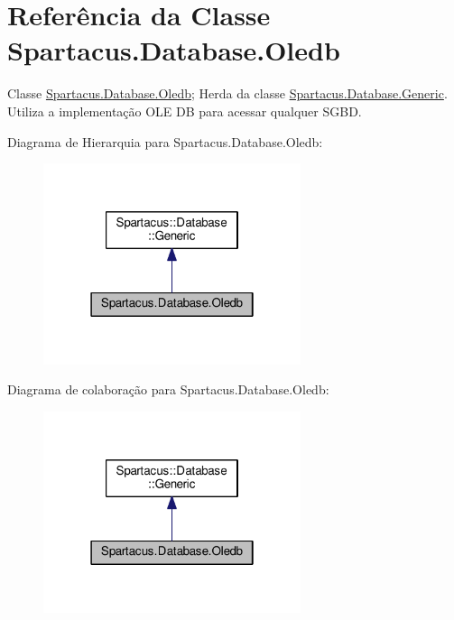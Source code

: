 \hypertarget{classSpartacus_1_1Database_1_1Oledb}{\section{Referência da Classe Spartacus.\+Database.\+Oledb}
\label{classSpartacus_1_1Database_1_1Oledb}
}


Classe \hyperlink{classSpartacus_1_1Database_1_1Oledb}{Spartacus.\+Database.\+Oledb}; Herda da classe \hyperlink{classSpartacus_1_1Database_1_1Generic}{Spartacus.\+Database.\+Generic}. Utiliza a implementação O\+L\+E D\+B para acessar qualquer S\+G\+B\+D.  




Diagrama de Hierarquia para Spartacus.\+Database.\+Oledb\+:
\nopagebreak
\begin{figure}[H]
\begin{center}
\leavevmode
\includegraphics[width=214pt]{classSpartacus_1_1Database_1_1Oledb__inherit__graph}
\end{center}
\end{figure}


Diagrama de colaboração para Spartacus.\+Database.\+Oledb\+:
\nopagebreak
\begin{figure}[H]
\begin{center}
\leavevmode
\includegraphics[width=214pt]{classSpartacus_1_1Database_1_1Oledb__coll__graph}
\end{center}
\end{figure}

